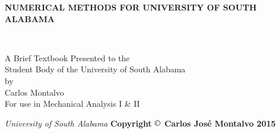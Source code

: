 \thispagestyle{empty}
\begin{center}
\begin{LARGE}{\bf NUMERICAL METHODS FOR UNIVERSITY OF SOUTH ALABAMA}\end{LARGE}\\
\large
\vspace{22 mm}
\begin{singlespace}
   A Brief Textbook Presented to the \\ 
   Student Body of the University of South Alabama \\
\vspace{22 mm}
   by\\
\vspace{22 mm}
  Carlos Montalvo \\
\vspace{22 mm}
For use in Mechanical Analysis I \& II \\
\vspace{82 mm}
\end{singlespace}
{\itshape University of South Alabama}
{\bf Copyright $\copyright$ Carlos Jos\'{e} Montalvo 2015}
\end{center}
